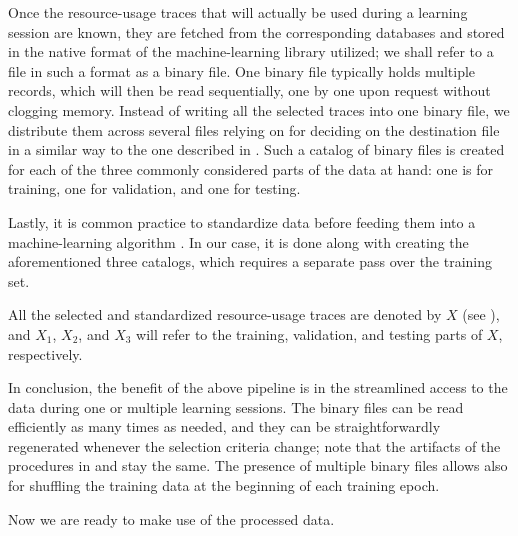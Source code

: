 Once the resource-usage traces that will actually be used during a learning
session are known, they are fetched from the corresponding databases and stored
in the native format of the machine-learning library utilized; we shall refer to
a file in such a format as a binary file. One binary file typically holds
multiple records, which will then be read sequentially, one by one upon request
without clogging memory. Instead of writing all the selected traces into one
binary file, we distribute them across several files relying on  for
deciding on the destination file in a similar way to the one described in
. Such a catalog of binary files is created for each of the three
commonly considered parts \cite{hastie2009} of the data at hand: one is for
training, one for validation, and one for testing.

Lastly, it is common practice to standardize data before feeding them into a
machine-learning algorithm \cite{hastie2009}. In our case, it is done along with
creating the aforementioned three catalogs, which requires a separate pass over
the training set.

All the selected and standardized resource-usage traces are denoted by $X$ (see
), and $X_1$, $X_2$, and $X_3$ will refer to the training,
validation, and testing parts of $X$, respectively.

In conclusion, the benefit of the above pipeline is in the streamlined access to
the data during one or multiple learning sessions. The binary files can be read
efficiently as many times as needed, and they can be straightforwardly
regenerated whenever the selection criteria change; note that the artifacts of
the procedures in  and  stay the same. The
presence of multiple binary files allows also for shuffling the training data at
the beginning of each training epoch.

Now we are ready to make use of the processed data.
